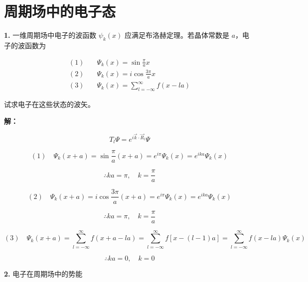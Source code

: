 \chapter{周期场中的电子态\label{ch:7}}

\noindent \textbf{1.\quad} 一维周期场中电子的波函数 $\psi_k(x)$ 应满足布洛赫定理。若晶体常数是 $a$，电子的波函数为

\begin{align*}
    (1) \quad & \Psi_k(x) = \sin \frac{\pi}{a}x \\
    (2) \quad & \Psi_k(x) = i \cos \frac{3\pi}{a}x \\
    (3) \quad & \Psi_k(x) = \sum_{l=-\infty}^{\infty} f(x-la)
\end{align*}

试求电子在这些状态的波矢。

\noindent \textbf{解：}

\begin{equation*}
    T_l \Psi = e^{i \vec{k} \cdot \vec{R}_l} \Psi
\end{equation*}

\begin{equation*}
    (1) \quad \Psi_k(x+a) = \sin \frac{\pi}{a} (x+a) = e^{i\pi} \Psi_k(x) = e^{ika} \Psi_k (x)
\end{equation*}

\begin{equation*}
    \therefore ka = \pi, \quad k = \frac{\pi}{a}
\end{equation*}

\begin{equation*}
    (2) \quad \Psi_k(x+a) = i\cos \frac{3\pi}{a} (x+a) = e^{i\pi} \Psi_k(x) = e^{ika} \Psi_k (x)
\end{equation*}

\begin{equation*}
    \therefore ka = \pi, \quad k = \frac{\pi}{a}
\end{equation*}

\begin{equation*}
    (3) \quad \Psi_k(x+a) = \sum_{l=-\infty}^{\infty} f(x+a-la) = \sum_{l=-\infty}^{\infty} f[x-(l-1)a] = \sum_{l=-\infty}^{\infty} f(x-la) \Psi_k (x)
\end{equation*}

\begin{equation*}
    \therefore ka = 0, \quad k = 0
\end{equation*}

\noindent \textbf{2.\quad} 电子在周期场中的势能

